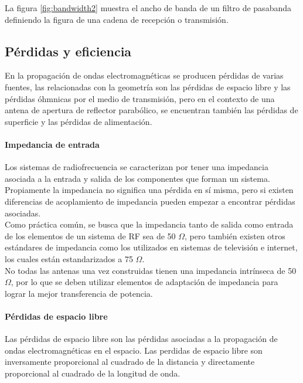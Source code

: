 La figura \ref{fig:bandwidth2} muestra el ancho de banda de un filtro de pasabanda definiendo la figura de una cadena de recepción o transmisión.\\


\subsection{Pérdidas y eficiencia}

En la propagación de ondas electromagnéticas se producen pérdidas de varias fuentes, las relacionadas con la geometría son las pérdidas de espacio libre y las pérdidas óhmnicas por el medio de transmisión, pero en el contexto de una antena de apertura de reflector parabólico, se encuentran también las pérdidas de superficie y las pérdidas de alimentación.\\

\paragraph{Impedancia de entrada}

Los sistemas de radiofrecuencia se caracterizan por tener una impedancia asociada a la entrada y salida de los componentes que forman un sistema. Propiamente la impedancia no significa una pérdida en sí misma, pero si existen diferencias de acoplamiento de impedancia pueden empezar a encontrar pérdidas asociadas.\\

Como práctica común, se busca que la impedancia tanto de salida como entrada de los elementos de un sistema de RF sea de 50 $\Omega$, pero también existen otros estándares de impedancia como los utilizados en sistemas de televisión e internet, los cuales están estandarizados a 75 $\Omega$.\\

No todas las antenas una vez construidas tienen una impedancia intrínseca de 50 $\Omega$, por lo que se deben utilizar elementos de adaptación de impedancia para lograr la mejor transferencia de potencia.\\

\paragraph{Pérdidas de espacio libre}

Las pérdidas de espacio libre son las pérdidas asociadas a la propagación de ondas electromagnéticas en el espacio. Las perdidas de espacio libre son inversamente proporcional al cuadrado de la distancia y directamente proporcional al cuadrado de la longitud de onda.

